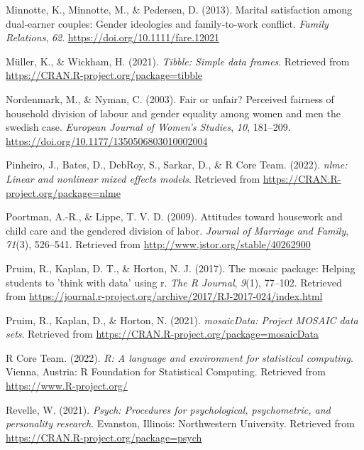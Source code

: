 \documentclass[
  man]{apa6}
\newlength{\cslhangindent}
\newlength{\cslentryspacingunit} %
\newenvironment{CSLReferences}[2] %
 {%
  \setlength{\parindent}{0pt}
  \ifodd #1
  \let\oldpar\par
  \def\par{\hangindent=\cslhangindent\oldpar}
  \fi
  \setlength{\parskip}{#2\cslentryspacingunit}
 }%
 {}
\begin{document}
\begin{CSLReferences}{1}{0}
\leavevmode{}%
Minnotte, K., Minnotte, M., \& Pedersen, D. (2013). Marital satisfaction among dual‐earner couples: Gender ideologies and family‐to‐work conflict. \emph{Family Relations}, \emph{62}. \url{https://doi.org/10.1111/fare.12021}

\leavevmode{}%
Müller, K., \& Wickham, H. (2021). \emph{Tibble: Simple data frames}. Retrieved from \url{https://CRAN.R-project.org/package=tibble}

\leavevmode{}%
Nordenmark, M., \& Nyman, C. (2003). Fair or unfair? Perceived fairness of household division of labour and gender equality among women and men the swedish case. \emph{European Journal of Women's Studies}, \emph{10}, 181--209. \url{https://doi.org/10.1177/1350506803010002004}

\leavevmode{}%
Pinheiro, J., Bates, D., DebRoy, S., Sarkar, D., \& R Core Team. (2022). \emph{{nlme}: Linear and nonlinear mixed effects models}. Retrieved from \url{https://CRAN.R-project.org/package=nlme}

\leavevmode{}%
Poortman, A.-R., \& Lippe, T. V. D. (2009). Attitudes toward housework and child care and the gendered division of labor. \emph{Journal of Marriage and Family}, \emph{71}(3), 526--541. Retrieved from \url{http://www.jstor.org/stable/40262900}

\leavevmode{}%
Pruim, R., Kaplan, D. T., \& Horton, N. J. (2017). The mosaic package: Helping students to 'think with data' using r. \emph{The R Journal}, \emph{9}(1), 77--102. Retrieved from \url{https://journal.r-project.org/archive/2017/RJ-2017-024/index.html}

\leavevmode{}%
Pruim, R., Kaplan, D., \& Horton, N. (2021). \emph{mosaicData: Project MOSAIC data sets}. Retrieved from \url{https://CRAN.R-project.org/package=mosaicData}

\leavevmode{}%
R Core Team. (2022). \emph{R: A language and environment for statistical computing}. Vienna, Austria: R Foundation for Statistical Computing. Retrieved from \url{https://www.R-project.org/}

\leavevmode{}%
Revelle, W. (2021). \emph{Psych: Procedures for psychological, psychometric, and personality research}. Evanston, Illinois: Northwestern University. Retrieved from \url{https://CRAN.R-project.org/package=psych}


\end{CSLReferences}
\end{document}
